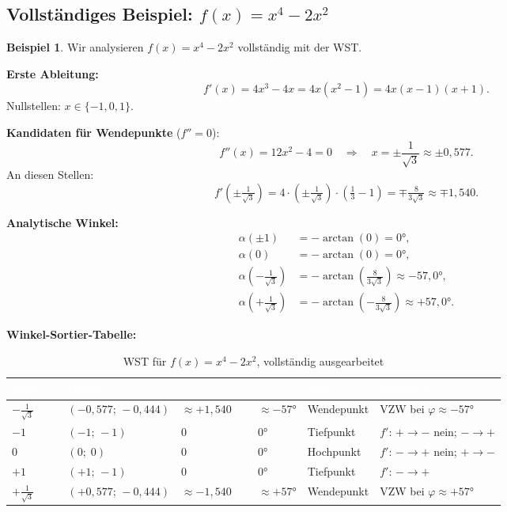 ﻿\documentclass[12pt, a4paper]{article}
\theoremstyle{definition}
\newtheorem{beispiel}{Beispiel}[section]
\begin{document}
	\subsection{Vollständiges Beispiel: $f(x) = x^4 - 2x^2$}
	
	\begin{beispiel}
		Wir analysieren $f(x) = x^4 - 2x^2$ vollständig mit der WST.
		
		\textbf{Erste Ableitung:}
		\[
		f'(x) = 4x^3 - 4x = 4x(x^2 - 1) = 4x(x-1)(x+1).
		\]
		Nullstellen: $x \in \{-1, 0, 1\}$.
		
		\textbf{Kandidaten für Wendepunkte} ($f'' = 0$):
		\[
		f''(x) = 12x^2 - 4 = 0 \quad\Rightarrow\quad x = \pm\frac{1}{\sqrt{3}} \approx \pm 0{,}577.
		\]
		An diesen Stellen:
		\[
		f'\!\left(\pm\tfrac{1}{\sqrt{3}}\right)
		= 4\cdot\left(\pm\tfrac{1}{\sqrt{3}}\right)\!\cdot\!\left(\tfrac{1}{3}-1\right)
		= \mp\tfrac{8}{3\sqrt{3}} \approx \mp 1{,}540.
		\]
		
		\textbf{Analytische Winkel:}
		\begin{align*}
			\alpha(\pm 1) &= -\arctan(0) = 0 °, \\
			\alpha(0)     &= -\arctan(0) = 0 °, \\
			\alpha\!\left(-\tfrac{1}{\sqrt{3}}\right) &= -\arctan\!\left(\tfrac{8}{3\sqrt{3}}\right) \approx -57{,}0 °, \\
			\alpha\!\left(+\tfrac{1}{\sqrt{3}}\right) &= -\arctan\!\left(-\tfrac{8}{3\sqrt{3}}\right) \approx +57{,}0 °.
		\end{align*}
		
		\textbf{Winkel-Sortier-Tabelle:}
		
		\begin{table}[H]
			\centering
			\caption{WST für $f(x) = x^4 - 2x^2$, vollständig ausgearbeitet}
			\renewcommand{\arraystretch}{1.55}
			\begin{tabular}{C{1.5cm} C{2.7cm} C{2.2cm} C{2.2cm} C{2.4cm} L{2.5cm}}
				\toprule
				\textcolor{white}{\textbf{Stelle $x_i$}} &
				\textcolor{white}{\textbf{Punkt}} &
				\textcolor{white}{\textbf{$m_i = f'(x_i)$}} &
				\textcolor{white}{\textbf{$\alpha_i$}} &
				\textcolor{white}{\textbf{Typ}} &
				\textcolor{white}{\textbf{Nachweis}} \\
				\midrule
				$-\frac{1}{\sqrt{3}}$ & $(-0{,}577;\,-0{,}444)$ & $\approx+1{,}540$ & $\approx -57 °$ & Wendepunkt & VZW bei $\varphi\approx -57 °$ \\
				$-1$ & $(-1;\,-1)$ & $0$ & $0 °$ & Tiefpunkt & $f'$: $+\to -$ nein; $-\to +$ \\
				$0$ & $(0;\;0)$ & $0$ & $0 °$ & Hochpunkt & $f'$: $-\to +$ nein; $+\to -$ \\
				$+1$ & $(+1;\,-1)$ & $0$ & $0 °$ & Tiefpunkt & $f'$: $-\to +$ \\
				$+\frac{1}{\sqrt{3}}$ & $(+0{,}577;\,-0{,}444)$ & $\approx-1{,}540$ & $\approx +57 °$ & Wendepunkt & VZW bei $\varphi\approx +57 °$ \\
				\bottomrule
			\end{tabular}
		\end{table}
		

\end{beispiel}
\end{document}
